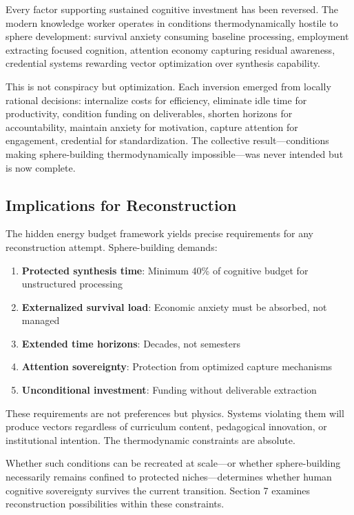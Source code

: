 Every factor supporting sustained cognitive investment has been reversed. The modern knowledge worker operates in conditions thermodynamically hostile to sphere development: survival anxiety consuming baseline processing, employment extracting focused cognition, attention economy capturing residual awareness, credential systems rewarding vector optimization over synthesis capability.

This is not conspiracy but optimization. Each inversion emerged from locally rational decisions: internalize costs for efficiency, eliminate idle time for productivity, condition funding on deliverables, shorten horizons for accountability, maintain anxiety for motivation, capture attention for engagement, credential for standardization. The collective result---conditions making sphere-building thermodynamically impossible---was never intended but is now complete.

\subsection{Implications for Reconstruction}

The hidden energy budget framework yields precise requirements for any reconstruction attempt. Sphere-building demands:

\begin{enumerate}
    \item \textbf{Protected synthesis time}: Minimum 40\% of cognitive budget for unstructured processing
    \item \textbf{Externalized survival load}: Economic anxiety must be absorbed, not managed
    \item \textbf{Extended time horizons}: Decades, not semesters
    \item \textbf{Attention sovereignty}: Protection from optimized capture mechanisms
    \item \textbf{Unconditional investment}: Funding without deliverable extraction
\end{enumerate}

These requirements are not preferences but physics. Systems violating them will produce vectors regardless of curriculum content, pedagogical innovation, or institutional intention. The thermodynamic constraints are absolute.

Whether such conditions can be recreated at scale---or whether sphere-building necessarily remains confined to protected niches---determines whether human cognitive sovereignty survives the current transition. Section 7 examines reconstruction possibilities within these constraints.

% 
%
%
%
